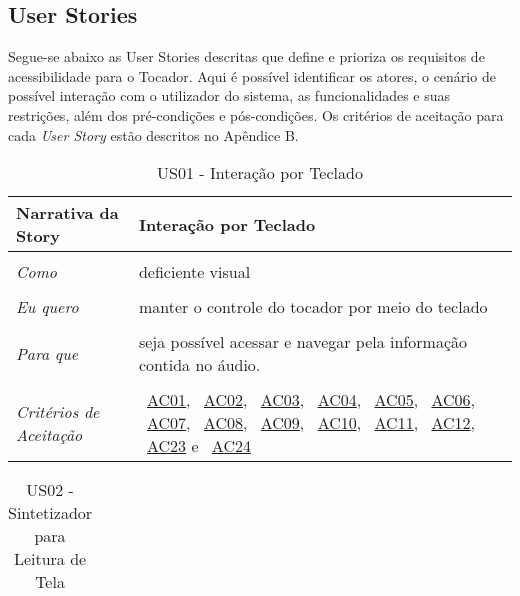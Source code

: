 \begin{apendicesenv}

\partapendices

\chapter{User Stories}\label{userstories}

Segue-se abaixo as User Stories descritas que define e prioriza os requisitos de acessibilidade para o Tocador. Aqui é possível identificar os atores, o cenário de possível interação com o utilizador do sistema, as funcionalidades e suas restrições, além dos pré-condições e pós-condições. Os critérios de aceitação para cada \textit{User Story} estão descritos no Apêndice B.

\begin{table}[ht]
\centering
\caption{US01 - Interação por Teclado}
\vspace{0.1cm}
\begin{center}
\begin{tabularx}{\textwidth}{|lX|l|}

\hline 
\textbf{Narrativa da Story} & Interação por Teclado \\
\hline
& \\
\textit{Como} & deficiente visual \\
 & \\
\textit{Eu quero} & manter o controle do tocador por meio do teclado \\
& \\
\textit{Para que} & seja possível acessar e navegar pela informação contida no áudio. \\
& \\
\hline
\textit{Critérios de Aceitação} & ~\hyperref[tab:us01a1]{AC01}, ~\hyperref[tab:us01a2]{AC02}, ~\hyperref[tab:us01a3]{AC03}, ~\hyperref[tab:us01a4]{AC04}, ~\hyperref[tab:us01a5]{AC05}, ~\hyperref[tab:us01a6]{AC06}, ~\hyperref[tab:us01a7]{AC07}, ~\hyperref[tab:us01a8]{AC08}, ~\hyperref[tab:us01a9]{AC09}, ~\hyperref[tab:us01a10]{AC10}, ~\hyperref[tab:us01a11]{AC11}, ~\hyperref[tab:us01a12]{AC12}, ~\hyperref[tab:us01a23]{AC23} e ~\hyperref[tab:us01a24]{AC24} \\
\hline

\end{tabularx}
\end{center}
\label{tab:us01}
\end{table}

\begin{table}[ht]
\centering
\caption{US02 - Sintetizador para Leitura de Tela}
\vspace{0.1cm}
\begin{center}
\begin{tabularx}{\textwidth}{|lX|l|}


\end{tabularx}
\end{center}
\end{table}
\end{apendicesenv}
